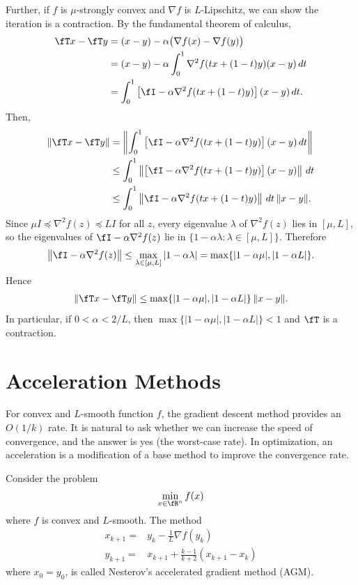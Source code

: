 \documentclass{article}
\begin{document}
Further, if $f$ is $\mu$-strongly convex and $\nabla f$ is $L$-Lipschitz, we can show the iteration is a contraction.
By the fundamental theorem of calculus,
\begin{align}
    \fT x - \fT y
    &= (x-y) - \alpha\bigl(\nabla f(x) - \nabla f(y)\bigr) \\
    &= (x-y) - \alpha \int_0^1 \nabla^2 f(tx + (1-t)y)(x-y)\,dt \\
    &= \int_0^1 \left[\fI - \alpha\nabla^2 f(tx+(1-t)y)\right](x-y) \,dt.
\end{align}
Then,
\begin{align}
    \|\fT x - \fT y\|
    &=\left\|\int_0^1 \left[\fI - \alpha\nabla^2 f(tx+(1-t)y)\right](x-y) \,dt\right\|\\
    &\leq  \int_0^1 \left\|\left[\fI - \alpha\nabla^2 f(tx+(1-t)y)\right](x-y) \right\|\,dt \\
    &\le \int_0^1 \left\|\fI - \alpha\nabla^2 f(tx+(1-t)y)\right\|\,dt \,\|x-y\|.
\end{align}
Since $\mu I\preceq \nabla^2 f(z) \preceq L I$ for all $z$, every eigenvalue
$\lambda$ of $\nabla^2 f(z)$ lies in $[\mu,L]$, so the eigenvalues of
$\fI - \alpha \nabla^2 f(z)$ lie in $\{1-\alpha\lambda : \lambda\in[\mu,L]\}$.
Therefore
\begin{align}
    \left\|\fI - \alpha\nabla^2 f(z)\right\|
    \le \max_{\lambda\in[\mu,L]} |1-\alpha\lambda|
    = \max\{|1-\alpha\mu|, |1-\alpha L|\}.
\end{align}
Hence
\begin{align}
    \|\fT x - \fT y\|
    \leq \max\{|1-\alpha\mu|, |1-\alpha L|\}\,\|x-y\|.
\end{align}
In particular, if $0 < \alpha < 2/L$, then $\max\{|1-\alpha\mu|, |1-\alpha L|\} < 1$
and $\fT$ is a contraction.

\section{Acceleration Methods}
For convex and $L$-smooth function $f$, the gradient descent method provides an $O(1/k)$ rate.
It is natural to ask whether we can increase the speed of convergence, and the answer is yes (the worst-case rate).
In optimization, an acceleration is a modification of a base method to improve the convergence rate.

Consider the problem
\begin{align}
    \min_{x\in\fR^n} f(x)
\end{align}
where $f$ is convex and $L$-smooth.
The method 
\begin{align}
    x_{k+1} =& y_k - \frac{1}{L}\nabla f(y_k)\\
    y_{k+1} =& x_{k+1}+\frac{k-1}{k+2}(x_{k+1}-x_k)
\end{align}
where $x_0=y_0$, is called Nesterov's accelerated gradient method (AGM).
\end{document}
